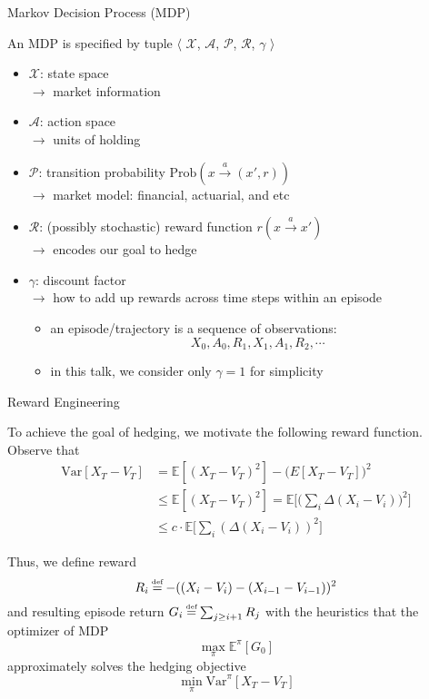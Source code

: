 \documentclass[10pt]{beamer}
\newcommand\mydef{\mathrel{\stackrel{\makebox[0pt]{\mbox{\normalfont\tiny def}}}{=}}}
\theoremstyle{definition}
\begin{document}
\begin{frame}{Markov Decision Process (MDP)}

An MDP is specified by tuple $\langle$ $\mathcal{X}$, $\mathcal{A}$, $\mathcal{P}$, $\mathcal{R}$, $\gamma$ $\rangle$
\begin{itemize}
    \item $\mathcal{X}$: state space \\
    $\to$ market information
    \item $\mathcal{A}$: action space \\
    $\to$ units of holding
    \item $\mathcal{P}$: transition probability $\text{Prob}(x \xrightarrow{a} (x', r))$ \\
    $\to$ market model: financial, actuarial, and etc
    \item $\mathcal{R}$: (possibly stochastic) reward function $r(x \xrightarrow{a} x')$ \\
    $\to$ encodes our goal to hedge
    \item $\gamma$: discount factor \\
    $\to$ how to add up rewards across time steps within an episode
        \begin{itemize}
                \item an episode/trajectory is a sequence of observations:
                $$ X_0, A_0, R_1, X_1, A_1, R_2, \cdots $$
                \item in this talk, we consider only $\gamma = 1$ for simplicity
        \end{itemize}
\end{itemize}

\end{frame}


\begin{frame}{Reward Engineering}

To achieve the goal of hedging, we motivate the following reward function. Observe that
\begin{align*}
    \boxed{\text{Var}[X_T - V_T]}
        &=    \mathbb{E}[(X_T - V_T)^2] - \mathbb({E}[X_T - V_T])^2 \\
        &\leq \mathbb{E}[(X_T - V_T)^2]
        =     \mathbb{E}\big[ \big( \sum_i \Delta(X_i - V_i) \big)^2 \big] \\
        &\leq \boxed{c \cdot \mathbb{E}\big[ \sum_i (\Delta(X_i - V_i))^2 \big]}
\end{align*}

Thus, we define reward
$$ R_i \mydef -((X_i - V_i) - (X_{i-1} - V_{i-1}))^2$$
and resulting episode return $G_i \mydef \sum_{j \geq i+1} R_j$ with the heuristics that the optimizer of MDP
$$ \max_\pi \mathbb{E}^{\pi}[G_0] $$
approximately solves the hedging objective
$$ \min_\pi \text{Var}^{\pi}[X_T - V_T] $$

\end{frame}
\end{document}

